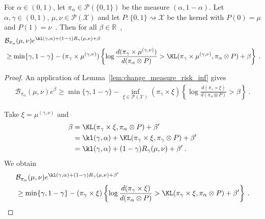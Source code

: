 \begin{lemma}
  \label{lem:change_measure_risk_mean}
  For $\alpha \in (0,1)$, let $\pi_\alpha \in \mathcal P(\{0,1\})$ be the measure $(\alpha, 1 - \alpha)$.
  Let $\alpha, \gamma \in (0,1)$, $\mu, \nu \in \mathcal P(\mathcal X)$ and let $P : \{0,1\} \rightsquigarrow \mathcal X$ be the kernel with $P(0) = \mu$ and $P(1) = \nu$~. Then for all $\beta \in \mathbb{R}$~,
  \begin{align*}
  &\mathcal B_{\pi_\alpha}(\mu, \nu) e^{\kl(\gamma, \alpha) + (1 - \gamma) R_\gamma(\mu, \nu) + \beta}
  \\
  &\ge \min\{\gamma, 1 - \gamma\} - (\pi_\gamma \times \mu^{(\gamma, \nu)})\left\{ \log\frac{d (\pi_\gamma \times \mu^{(\gamma, \nu)})}{d (\pi_\alpha \otimes P)} > \KL(\pi_\gamma \times \mu^{(\gamma, \nu)}, \pi_\alpha \otimes P) + \beta \right\}
  \: .
  \end{align*}
\end{lemma}

\begin{proof}%
{}
An application of Lemma~\ref{lem:change_measure_risk_inf} gives
\begin{align*}
\mathcal B_{\pi_\alpha}(\mu, \nu) e^{\beta}
\ge \min\{\gamma, 1 - \gamma\} - \inf_{\xi \in \mathcal P(\mathcal X)}(\pi_\gamma \times \xi)\left\{ \log\frac{d (\pi_\gamma \times \xi)}{d (\pi_\alpha \otimes P)} > \beta \right\}
\: .
\end{align*}

Take $\xi = \mu^{(\gamma, \nu)}$ and
\begin{align*}
\beta
&= \KL(\pi_\gamma \times \xi, \pi_\alpha \otimes P) + \beta'
\\
&= \kl(\gamma, \alpha) + \KL(\pi_\gamma \times \xi, \pi_\gamma \otimes P) + \beta'
\\
&= \kl(\gamma, \alpha) + (1 - \gamma) R_\gamma(\mu, \nu) + \beta'
\: .
\end{align*}
We obtain
\begin{align*}
&\mathcal B_{\pi_\alpha}(\mu, \nu) e^{\kl(\gamma, \alpha) + (1 - \gamma) R_\gamma(\mu, \nu) + \beta'}
\\
&\ge \min\{\gamma, 1 - \gamma\} - (\pi_\gamma \times \xi)\left\{ \log\frac{d (\pi_\gamma \times \xi)}{d (\pi_\alpha \otimes P)} > \KL(\pi_\gamma \times \xi, \pi_\alpha \otimes P) + \beta' \right\}
\: .
\end{align*}
\end{proof}


